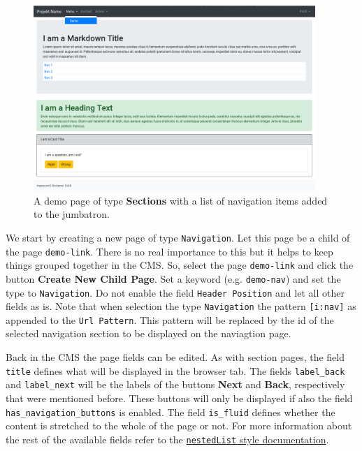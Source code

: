 \documentclass[a4paper,oneside]{book}
\begin{document}
\begin{figure}[ht]
    \centering
    \includegraphics[width=0.95\textwidth]{demo-nav.png}
    \caption{A demo page of type \textbf{Sections} with a list of navigation items added to the jumbatron.}
    \label{fig.demo-nav}
\end{figure}

We start by creating a new page of type \texttt{Navigation}.
Let this page be a child of the page \texttt{demo-link}.
There is no real importance to this but it helps to keep things grouped together in the CMS.
So, select the page \texttt{demo-link} and click the button \textbf{Create New Child Page}.
Set a keyword (e.g. \texttt{demo-nav}) and set the type to \texttt{Navigation}.
Do not enable the field \texttt{Header Position} and let all other fields as is.
Note that when selection the type \texttt{Navigation} the pattern \texttt{[i:nav]} as appended to the \texttt{Url Pattern}.
This pattern will be replaced by the id of the selected navigation section to be displayed on the naviagtion page.

Back in the CMS the page fields can be edited.
As with section pages, the field \texttt{title} defines what will be displayed in the browser tab.
The fields \texttt{label\_back} and \texttt{label\_next} will be the labels of the buttons \textbf{Next} and \textbf{Back}, respectively that were mentioned before.
These buttons will only be displayed if also the field \texttt{has\_navigation\_buttons} is enabled.
The field \texttt{is\_fluid} defines whether the content is stretched to the whole of the page or not.
For more information about the rest of the available fields refer to the \href{https://selfhelp.psy.unibe.ch/demo/style/362}{\texttt{nestedList} style documentation}.
\end{document}
